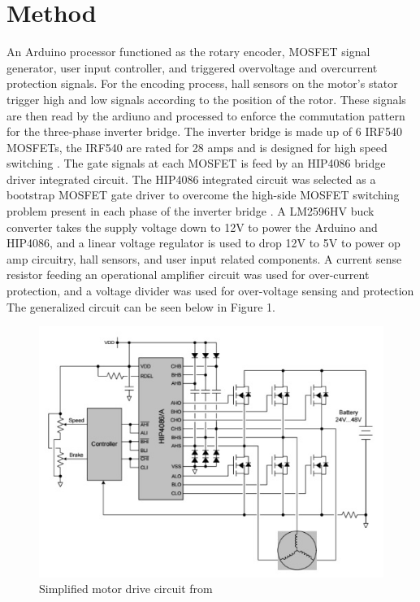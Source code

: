 \documentclass[journal,10pt]{IEEEtran}
\begin{document}
\section{Method}
	An Arduino processor functioned as the rotary encoder, MOSFET signal generator, user input controller, and triggered overvoltage and overcurrent protection signals. For the encoding process, hall sensors on the motor’s stator trigger high and low signals according to the position of the rotor. These signals are then read by the ardiuno and processed to enforce the commutation pattern for the three-phase inverter bridge. The inverter bridge is made up of 6 IRF540 MOSFETs, the IRF540 are rated for 28 amps and is designed for high speed switching \cite{irf}. The gate signals at each MOSFET is feed by an HIP4086 bridge driver integrated circuit. The HIP4086 integrated circuit was selected as a bootstrap MOSFET gate driver to overcome the high-side MOSFET switching problem present in each phase of the inverter bridge \cite{hip}. A LM2596HV buck converter takes the supply voltage down to 12V to power the Arduino and HIP4086, and a linear voltage regulator is used to drop 12V to 5V to power op amp circuitry, hall sensors, and user input related components. A current sense resistor feeding an operational amplifier circuit was used for over-current protection, and a voltage divider was used for over-voltage sensing and protection The generalized circuit can be seen below in Figure 1.

\begin{figure}[h]
\centering
\includegraphics[scale =0.5]{hip.jpg}
\caption{Simplified motor drive circuit from \cite{hip}}

\end{figure}
\end{document}
